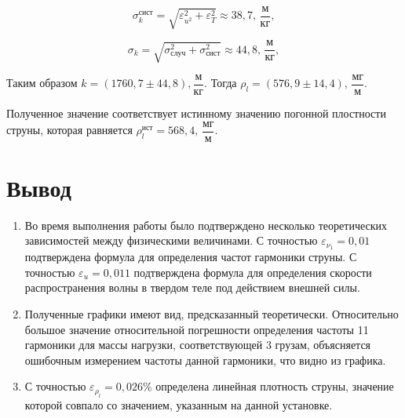 \documentclass[a4paper,12pt]{article}
\begin{document}
	\begin{equation}
		\sigma_k^{\text{сист}} = \sqrt{ \varepsilon_{u^2}^2 + \varepsilon_T^2 } \approx 38,7\text{, $\dfrac{\text{м}}{\text{кг}}$},
	\end{equation}
	
	\begin{equation}
		\sigma_k = \sqrt{\sigma_\text{случ}^2 + \sigma_\text{сист}^2} \approx 44,8\text{, $\dfrac{\text{м}}{\text{кг}}$},
	\end{equation}

	Таким образом $k = (1760,7 \pm 44,8) {, \dfrac{\text{м}}{\text{кг}}} $.
	Тогда \underline{ $\rho_l = (576,9 \pm 14,4) \text{, $\dfrac{\text{мг}}{\text{м}}$}$}.
	
	Полученное значение соответствует истинному значению погонной плостности струны, которая равняется $\rho^{\text{ист}}_l = 568,4\text{, $\dfrac{\text{мг}}{\text{м}}$} $. 
	\section{Вывод}
	
	\begin{enumerate}
		\item Во время выполнения работы было подтверждено несколько теоретических зависимостей между физическими величинами. С точностью $\varepsilon_{\nu_{1}} = 0,01$ подтверждена формула для определения частот гармоники струны. С точностью  $\varepsilon_{u} = 0,011$ подтверждена формула для определения скорости распространения волны в твердом теле под действием внешней силы.
		\item Полученные графики имеют вид, предсказанный теоретически. Относительно большое значение относительной погрешности определения частоты 11 гармоники для массы нагрузки, соответствующей 3 грузам, объясняется ошибочным измерением частоты данной гармоники, что видно из графика. 
		\item С точностью $ \varepsilon_{\rho_{l}} = 0,026 \%$ определена линейная плотность струны, значение которой совпало со значением, указанным на данной установке.
	\end{enumerate}
\end{document}
